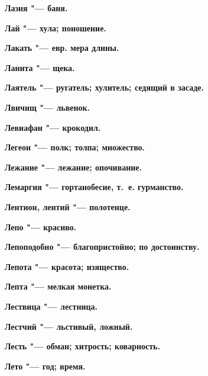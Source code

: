 \begin{mymulticols}{2}
\bfseries Лазня\normalfont{} "--- баня. 




\bfseries Лай\normalfont{} "--- хула; поношение. 




\bfseries Лакать\normalfont{} "--- евр. мера длины. 




\bfseries Ланита\normalfont{} "--- щека. 




\bfseries Лаятель\normalfont{} "--- ругатель; хулитель; седящий в засаде. 




\bfseries Лвичищ\normalfont{} "--- львенок. 




\bfseries Левиафан\normalfont{} "--- крокодил. 




\bfseries Легеон\normalfont{} "--- полк; толпа; множество. 




\bfseries Лежание\normalfont{} "--- лежание; опочивание. 




\bfseries Лемаргия\normalfont{} "--- гортанобесие, т.~е. гурманство. 




\bfseries Лентион, лентий\normalfont{} "--- полотенце. 




\bfseries Лепо\normalfont{} "--- красиво. 




\bfseries Лепоподобно\normalfont{} "--- благопристойно; по достоинству. 




\bfseries Лепота\normalfont{} "--- красота; изящество. 




\bfseries Лепта\normalfont{} "--- мелкая монетка. 




\bfseries Лествица\normalfont{} "--- лестница. 




\bfseries Лестчий\normalfont{} "--- льстивый, ложный. 




\bfseries Лесть\normalfont{} "--- обман; хитрость; коварность. 




\bfseries Лето\normalfont{} "--- год; время. 





\end{mymulticols}
